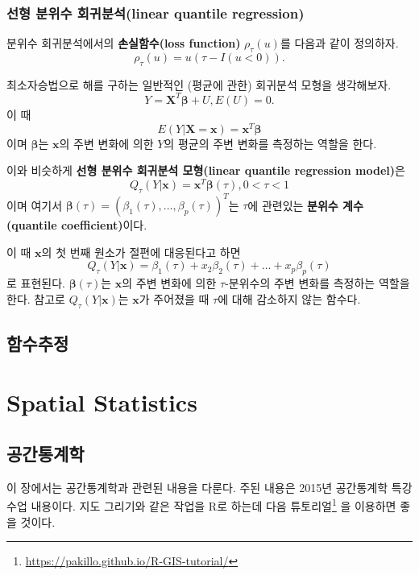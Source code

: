 \documentclass[b5paper,]{scrbook}
\theoremstyle{plain}
\theoremstyle{definition}
\numberwithin{equation}{section}
\renewcommand{\href}[2]{#2\footnote{\url{#1}}}
\begin{document}
\section{선형 분위수 회귀분석(linear quantile
regression)}\label{--linear-quantile-regression}

분위수 회귀분석에서의 \textbf{손실함수(loss function)}
\(\rho_{\tau}(u)\)를 다음과 같이 정의하자.
\[\rho_{\tau}(u)=u(\tau -I(u<0)).\]

최소자승법으로 해를 구하는 일반적인 (평균에 관한) 회귀분석 모형을
생각해보자. \[Y=\mathbf{X}^{T}\boldsymbol{\beta}+U, E(U)=0.\] 이 때
\[E(Y|\mathbf{X}=\mathbf{x})=\mathbf{x}^{T}\boldsymbol{\beta}\] 이며
\(\boldsymbol{\beta}\)는 \(\mathbf{x}\)의 주변 변화에 의한 \(Y\)의
평균의 주변 변화를 측정하는 역할을 한다.

이와 비슷하게 \textbf{선형 분위수 회귀분석 모형(linear quantile
regression model)}은
\[Q_{\tau}(Y|\mathbf{x})=\mathbf{x}^{T}\boldsymbol{\beta}(\tau), 0<\tau <1\]
이며 여기서
\(\boldsymbol{\beta}(\tau)=(\beta_{1}(\tau),\ldots , \beta_{p}(\tau))^{T}\)는
\(\tau\)에 관련있는 \textbf{분위수 계수(quantile coefficient)}이다.

이 때 \(\mathbf{x}\)의 첫 번째 원소가 절편에 대응된다고 하면
\[Q_{\tau}(Y|\mathbf{x})=\beta_{1}(\tau)+x_{2}\beta_{2}(\tau)+\ldots +x_{p}\beta_{p}(\tau)\]
로 표현된다. \(\boldsymbol{\beta}(\tau)\)는 \(\mathbf{x}\)의 주변 변화에
의한 \(\tau\)-분위수의 주변 변화를 측정하는 역할을 한다. 참고로
\(Q_{\tau}(Y|\mathbf{x})\)는 \(\mathbf{x}\)가 주어졌을 때 \(\tau\)에
대해 감소하지 않는 함수다.

\chapter{함수추정}\label{functionestimation}

\part{Spatial Statistics}\label{part-spatial-statistics}

\chapter{공간통계학}\label{spatial}

이 장에서는 공간통계학과 관련된 내용을 다룬다. 주된 내용은 2015년
공간통계학 특강 수업 내용이다. 지도 그리기와 같은 작업을 R로 하는데
\href{https://pakillo.github.io/R-GIS-tutorial/}{다음 튜토리얼} 을
이용하면 좋을 것이다.
\end{document}
